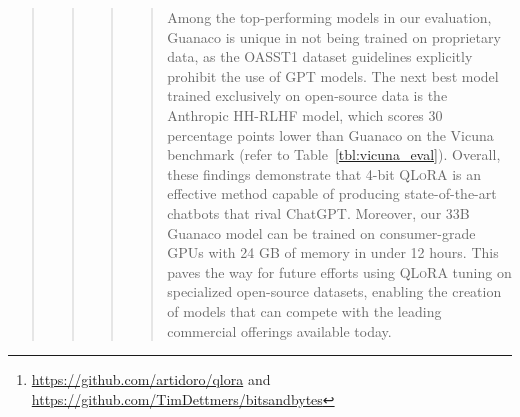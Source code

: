 \begin{quote}
\begin{quote}
\begin{quote}
\begin{quote}
\begin{abstract}
We introduce \textsc{QLoRA}, a memory-efficient finetuning method that enables the finetuning of a 65 billion parameter model on a single 48GB GPU, while maintaining the performance of full 16-bit finetuning tasks. \textsc{QLoRA} backpropagates gradients through a frozen, 4-bit quantized pretrained language model into Low Rank Adapters~(LoRA). Our top-performing model family, named \textbf{Guanaco}, surpasses all previously publicly available models on the Vicuna benchmark, achieving 99.3\% of ChatGPT’s performance with only 24 hours of finetuning on a single GPU. \textsc{QLoRA} incorporates several innovations to reduce memory consumption without compromising performance: (a) 4-bit NormalFloat (NF4), a novel data type that is information-theoretically optimal for weights with a normal distribution; (b) Double Quantization, which lowers the average memory footprint by quantizing the quantization parameters; and (c) Paged Optimizers to handle memory spikes efficiently. We utilize \textsc{QLoRA} to finetune over 1,000 models, conducting an extensive evaluation of instruction-following and chatbot capabilities across 8 instruction datasets, various model architectures (LLaMA, T5), and model sizes, including large models (e.g., 33B and 65B parameters) that are impractical for standard finetuning. Our findings demonstrate that QLoRA finetuning on a compact, high-quality dataset achieves state-of-the-art outcomes, even with smaller models compared to previous SoTA. We also provide a thorough assessment of chatbot performance using both human and GPT-4 evaluations, indicating that GPT-4 evaluations serve as an inexpensive and reliable proxy for human assessment. Additionally, we reveal that existing chatbot benchmarks lack reliability in accurately measuring chatbot performance levels. A carefully selected error analysis highlights scenarios where \textbf{Guanaco} underperforms relative to ChatGPT. We release all our models and code, including CUDA kernels for 4-bit training.\footnote{\url{https://github.com/artidoro/qlora} and \url{https://github.com/TimDettmers/bitsandbytes}}
\end{abstract}

Among the top-performing models in our evaluation, {Guanaco} is unique in not being trained on proprietary data, as the OASST1 dataset guidelines explicitly prohibit the use of GPT models. The next best model trained exclusively on open-source data is the Anthropic HH-RLHF model, which scores 30 percentage points lower than {Guanaco} on the Vicuna benchmark (refer to Table~\ref{tbl:vicuna_eval}). Overall, these findings demonstrate that 4-bit \textsc{QLoRA} is an effective method capable of producing state-of-the-art chatbots that rival ChatGPT. Moreover, our 33B {Guanaco} model can be trained on consumer-grade GPUs with 24 GB of memory in under 12 hours. This paves the way for future efforts using \textsc{QLoRA} tuning on specialized open-source datasets, enabling the creation of models that can compete with the leading commercial offerings available today.


\end{quote}
\end{quote}
\end{quote}
\end{quote}

